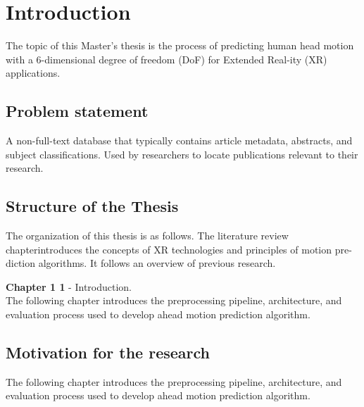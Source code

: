 \chapter{Introduction}
\label{sec:intro}
The topic of this Master’s thesis is the process of predicting human head motion with a 6-dimensional degree of freedom (DoF) for Extended Real-ity (XR) applications. 


\section{Problem statement}
\label{sec:intro:problem}
A non-full-text database that typically contains article metadata, abstracts, and subject classifications. Used by researchers to locate publications relevant to their research.


\section{Structure of the Thesis}
\label{sec:intro:structure}
The organization of this thesis is as follows. The literature review chapterintroduces the concepts of XR technologies and principles of motion pre-diction algorithms. It follows an overview of previous research. 

\textbf{Chapter 1 1} - Introduction.\\
The following chapter introduces the preprocessing pipeline, architecture, and evaluation process used to develop ahead motion prediction algorithm.


\section{Motivation for the research}
\label{sec:intro:motivation}
The following chapter introduces the preprocessing pipeline, architecture, and evaluation process used to develop ahead motion prediction algorithm.
